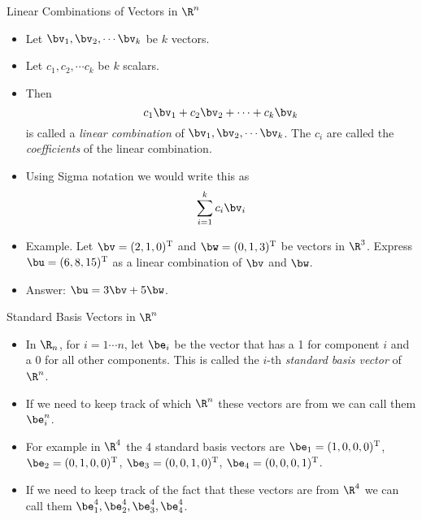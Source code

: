 \documentclass{beamer}
\begin{document}
\beamerdefaultoverlayspecification{<+->}

\begin{frame}{Linear Combinations of Vectors in $\R^n$}

\begin{itemize}
\item Let $\bv_1, \bv_2, \cdots  \bv_k$ be $k$ vectors.
\item Let $c_1, c_2, \cdots c_k$ be $k$ scalars.
\item Then $$c_1 \bv_1 + c_2 \bv_2 + \cdots + c_k \bv_k$$ is
called a \emph{linear combination} of $\bv_1, \bv_2, \cdots \bv_k$.
The $c_i$ are called the \emph{coefficients} of the linear combination.
\item Using Sigma notation we would write this as
$$\sum_{i=1}^{k} c_i \bv_i$$
\item Example. Let $\bv = (2, 1, 0)^{\text{T}}$ and $\bw = (0, 1, 3)^{\text{T}}$ be vectors in $\R^3$.
Express $\bu = (6, 8, 15)^{\text{T}}$ as a linear combination of $\bv$ and $\bw$.
\item Answer: $\bu = 3 \bv + 5 \bw$.
\end{itemize}

\end{frame}

\begin{frame}{Standard Basis Vectors in $\R^n$}

\begin{itemize}
\item In $\R_n$, for $i=1\cdots n$,
 let $\be_i$ be the vector that has a 1 for component $i$ and
a 0 for all other components. This is called the $i$-th
\emph{standard basis vector} of $\R^n$.
\item If we need to keep track of which $\R^n$ these vectors are from we can
call them $\be^n_i$.
\item For example in $\R^4$ the 4 standard basis vectors are
 $\be_1 = (1,0,0,0)^{\text{T}}$, $\be_2 = (0,1,0,0)^{\text{T}}$,
$\be_3 = (0,0,1,0)^{\text{T}}$, $\be_4 = (0,0,0,1)^{\text{T}}$.
\item If we need to keep track of the fact that these vectors are from $\R^4$
we can call them $\be_1^4, \be_2^4, \be_3^4, \be_4^4$.
\end{itemize}

\end{frame}
\end{document}
